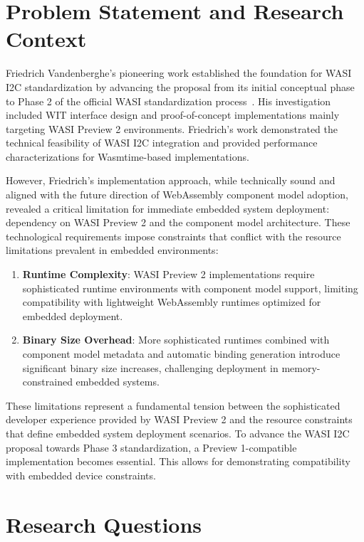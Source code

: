 \section{Problem Statement and Research Context}
\label{sec:problem-statement}

Friedrich Vandenberghe's pioneering work established the foundation for WASI I2C standardization by advancing the proposal from its initial conceptual phase to Phase 2 of the official WASI standardization process~\cite{friedrich_thesis}. His investigation included WIT interface design and proof-of-concept implementations mainly targeting WASI Preview 2 environments. Friedrich's work demonstrated the technical feasibility of WASI I2C integration and provided performance characterizations for Wasmtime-based implementations.

However, Friedrich's implementation approach, while technically sound and aligned with the future direction of WebAssembly component model adoption, revealed a critical limitation for immediate embedded system deployment: dependency on WASI Preview 2 and the component model architecture. These technological requirements impose constraints that conflict with the resource limitations prevalent in embedded environments:

\begin{enumerate}
    \item \textbf{Runtime Complexity}: WASI Preview 2 implementations require sophisticated runtime environments with component model support, limiting compatibility with lightweight WebAssembly runtimes optimized for embedded deployment.
    
    \item \textbf{Binary Size Overhead}: More sophisticated runtimes combined with component model metadata and automatic binding generation introduce significant binary size increases, challenging deployment in memory-constrained embedded systems.
\end{enumerate}

These limitations represent a fundamental tension between the sophisticated developer experience provided by WASI Preview 2 and the resource constraints that define embedded system deployment scenarios. To advance the WASI I2C proposal towards Phase 3 standardization, a Preview 1-compatible implementation becomes essential. This allows for demonstrating compatibility with embedded device constraints.




\section{Research Questions}
\label{sec:research-questions}

